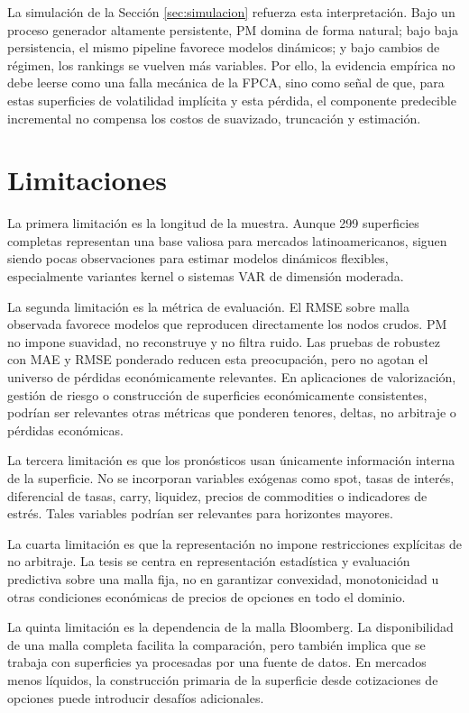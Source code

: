 \documentclass[a4paper,11pt]{article}
\newcommand{\SVIs}{superficies de volatilidad implícita}
\begin{document}
La simulación de la Sección \ref{sec:simulacion} refuerza esta interpretación. Bajo un proceso generador altamente persistente, PM domina de forma natural; bajo baja persistencia, el mismo pipeline favorece modelos dinámicos; y bajo cambios de régimen, los rankings se vuelven más variables. Por ello, la evidencia empírica no debe leerse como una falla mecánica de la FPCA, sino como señal de que, para estas \SVIs{} y esta pérdida, el componente predecible incremental no compensa los costos de suavizado, truncación y estimación.

\section{Limitaciones}

La primera limitación es la longitud de la muestra. Aunque 299 superficies completas representan una base valiosa para mercados latinoamericanos, siguen siendo pocas observaciones para estimar modelos dinámicos flexibles, especialmente variantes kernel o sistemas VAR de dimensión moderada.

La segunda limitación es la métrica de evaluación. El RMSE sobre malla observada favorece modelos que reproducen directamente los nodos crudos. PM no impone suavidad, no reconstruye y no filtra ruido. Las pruebas de robustez con MAE y RMSE ponderado reducen esta preocupación, pero no agotan el universo de pérdidas económicamente relevantes. En aplicaciones de valorización, gestión de riesgo o construcción de superficies económicamente consistentes, podrían ser relevantes otras métricas que ponderen tenores, deltas, no arbitraje o pérdidas económicas.

La tercera limitación es que los pronósticos usan únicamente información interna de la superficie. No se incorporan variables exógenas como spot, tasas de interés, diferencial de tasas, carry, liquidez, precios de commodities o indicadores de estrés. Tales variables podrían ser relevantes para horizontes mayores.

La cuarta limitación es que la representación no impone restricciones explícitas de no arbitraje. La tesis se centra en representación estadística y evaluación predictiva sobre una malla fija, no en garantizar convexidad, monotonicidad u otras condiciones económicas de precios de opciones en todo el dominio.

La quinta limitación es la dependencia de la malla Bloomberg. La disponibilidad de una malla completa facilita la comparación, pero también implica que se trabaja con superficies ya procesadas por una fuente de datos. En mercados menos líquidos, la construcción primaria de la superficie desde cotizaciones de opciones puede introducir desafíos adicionales.
\end{document}
